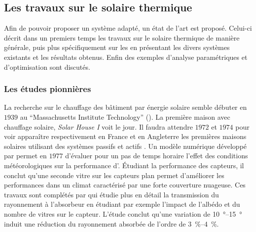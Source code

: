 \subsection{Les travaux sur le solaire thermique} %
\label{sub:les_travaux_sur_le_solaire_thermique}
Afin de pouvoir proposer un système adapté, un état de l’art est proposé. Celui-ci
décrit dans un premiers temps les travaux sur le solaire thermique de manière générale, puis
plus spécifiquement sur les  en présentant les divers systèmes existants
et les résultats obtenus. Enfin des exemples d’analyse paramétriques et d’optimisation
sont discutés.

\subsubsection{Les études pionnières} %
\label{ssub:les_etudes_pionnieres}
La recherche sur le chauffage des bâtiment par énergie solaire semble débuter en $1939$ au
\enquote{Massachusetts Institute Technology} (). La première maison avec
chauffage solaire, 
{\textit{Solar House I}} voit le jour. Il faudra attendre $1972$ et $1974$ pour voir apparaître respectivement
en France et en Angleterre les premières maisons solaires utilisant des systèmes passifs
et actifs \parencite{Michaelides1993}. Un modèle numérique développé par \textcite{Hunn197733}
permet en $1977$ d’évaluer pour un pas de temps horaire l’effet des conditions
météorologiques sur la performance d’. Étudiant la performance des capteurs, il
conclut qu’une seconde vitre sur les capteurs plan permet d’améliorer les performances
dans un climat caractérisé par une forte couverture nuageuse. Ces travaux sont complétés
par \textcite{Elsayed198989} qui étudie plus en détail la transmission du rayonnement à
l’absorbeur en étudiant par exemple l’impact de l’albédo et du nombre de vitres sur le
capteur. L’étude conclut qu’une variation de \SIrange{10}{15}{\degree} induit une
réduction du rayonnement absorbée de l’ordre de \SIrange{3}{4}{\percent}.

